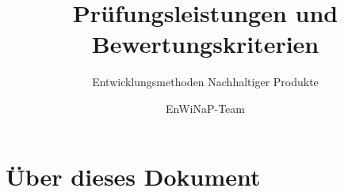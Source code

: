 \documentclass[DIV=15,headinclude=true]{scrreprt}
\begin{document}
\title{Prüfungsleistungen und Bewertungskriterien}
\subtitle{Entwicklungsmethoden Nachhaltiger Produkte}
\author{EnWiNaP-Team}
\maketitle

\tableofcontents


\section{Über dieses Dokument}



\printbibliography

\appendix
\end{document}
